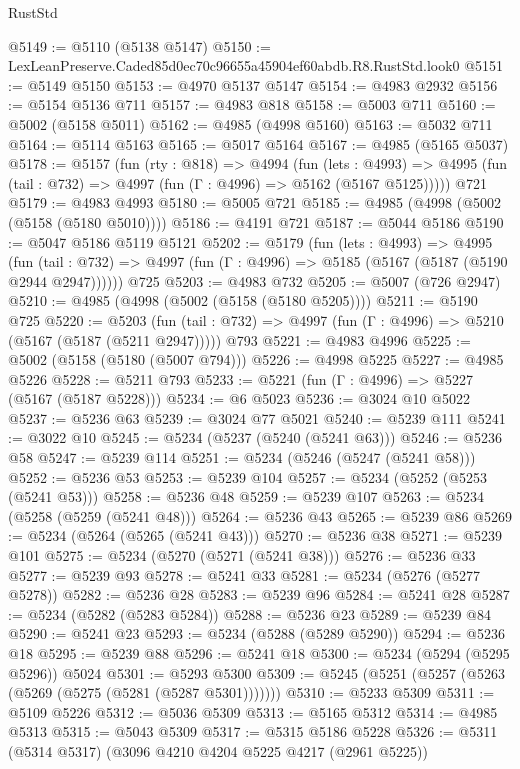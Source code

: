 \begin{lexlean}{RustStd}
\begin{coremodule}
@5149 := @5110 (@5138 @5147)
@5150 := LexLeanPreserve.Caded85d0ec70c96655a45904ef60abdb.R8.RustStd.look0
@5151 := @5149 @5150
@5153 := @4970 @5137 @5147
@5154 := @4983 @2932
@5156 := @5154 @5136 @711
@5157 := @4983 @818
@5158 := @5003 @711
@5160 := @5002 (@5158 @5011)
@5162 := @4985 (@4998 @5160)
@5163 := @5032 @711
@5164 := @5114 @5163
@5165 := @5017 @5164
@5167 := @4985 (@5165 @5037)
@5178 := @5157
    (fun (rty : @818) =>
    @4994
      (fun (lets : @4993) =>
      @4995 (fun (tail : @732) => @4997 (fun (Γ : @4996) => @5162 (@5167 @5125)))))
    @721
@5179 := @4983 @4993
@5180 := @5005 @721
@5185 := @4985 (@4998 (@5002 (@5158 (@5180 @5010))))
@5186 := @4191 @721
@5187 := @5044 @5186
@5190 := @5047 @5186 @5119 @5121
@5202 := @5179
    (fun (lets : @4993) =>
    @4995
      (fun (tail : @732) => @4997 (fun (Γ : @4996) => @5185 (@5167 (@5187 (@5190 @2944 @2947))))))
    @725
@5203 := @4983 @732
@5205 := @5007 (@726 @2947)
@5210 := @4985 (@4998 (@5002 (@5158 (@5180 @5205))))
@5211 := @5190 @725
@5220 := @5203
    (fun (tail : @732) => @4997 (fun (Γ : @4996) => @5210 (@5167 (@5187 (@5211 @2947)))))
    @793
@5221 := @4983 @4996
@5225 := @5002 (@5158 (@5180 (@5007 @794)))
@5226 := @4998 @5225
@5227 := @4985 @5226
@5228 := @5211 @793
@5233 := @5221 (fun (Γ : @4996) => @5227 (@5167 (@5187 @5228)))
@5234 := @6 @5023
@5236 := @3024 @10 @5022
@5237 := @5236 @63
@5239 := @3024 @77 @5021
@5240 := @5239 @111
@5241 := @3022 @10
@5245 := @5234 (@5237 (@5240 (@5241 @63)))
@5246 := @5236 @58
@5247 := @5239 @114
@5251 := @5234 (@5246 (@5247 (@5241 @58)))
@5252 := @5236 @53
@5253 := @5239 @104
@5257 := @5234 (@5252 (@5253 (@5241 @53)))
@5258 := @5236 @48
@5259 := @5239 @107
@5263 := @5234 (@5258 (@5259 (@5241 @48)))
@5264 := @5236 @43
@5265 := @5239 @86
@5269 := @5234 (@5264 (@5265 (@5241 @43)))
@5270 := @5236 @38
@5271 := @5239 @101
@5275 := @5234 (@5270 (@5271 (@5241 @38)))
@5276 := @5236 @33
@5277 := @5239 @93
@5278 := @5241 @33
@5281 := @5234 (@5276 (@5277 @5278))
@5282 := @5236 @28
@5283 := @5239 @96
@5284 := @5241 @28
@5287 := @5234 (@5282 (@5283 @5284))
@5288 := @5236 @23
@5289 := @5239 @84
@5290 := @5241 @23
@5293 := @5234 (@5288 (@5289 @5290))
@5294 := @5236 @18
@5295 := @5239 @88
@5296 := @5241 @18
@5300 := @5234 (@5294 (@5295 @5296)) @5024
@5301 := @5293 @5300
@5309 := @5245 (@5251 (@5257 (@5263 (@5269 (@5275 (@5281 (@5287 @5301)))))))
@5310 := @5233 @5309
@5311 := @5109 @5226
@5312 := @5036 @5309
@5313 := @5165 @5312
@5314 := @4985 @5313
@5315 := @5043 @5309
@5317 := @5315 @5186 @5228
@5326 := @5311 (@5314 @5317) (@3096 @4210 @4204 @5225 @4217 (@2961 @5225))

\end{coremodule}
\end{lexlean}
